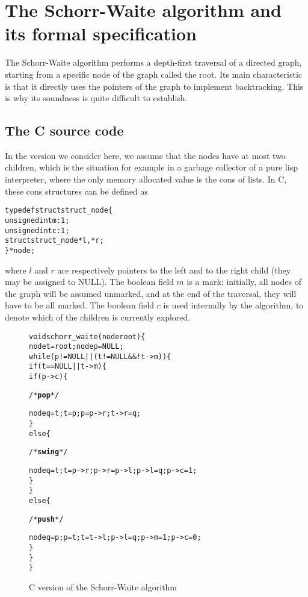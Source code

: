 
\section{The Schorr-Waite algorithm and its formal specification}
\label{sec:algo}

The Schorr-Waite algorithm performs a depth-first traversal of a
directed graph, starting from a specific node of the graph called the
root. Its main characteristic is that it directly uses the pointers of
the graph to implement backtracking. This is why its soundness is
quite difficult to establish. 

\subsection{The C source code}

In the version we consider here, we assume that the nodes have
at most two children, which is the situation for example in a garbage
collector of a pure lisp interpreter, where the only memory allocated
value is the \textsf{cons} of lists. In C, these \textsf{cons}
structures can be defined as
\begin{alltt}
typedef struct struct_node \{
  unsigned int m :1;
  unsigned int c :1;
  struct struct_node *l, *r;
\} * node;
\end{alltt}
where $l$ and $r$ are respectively pointers to the left and to the
right child (they may be assigned to NULL). The boolean field $m$ is a
mark: initially, all nodes of the graph will be assumed unmarked, and
at the end of the traversal, they will have to be all marked. The
boolean field $c$ is used internally by the algorithm, to denote which
of the children is currently explored.
 
\begin{figure}[b]
\vspace*{-5mm}
\hrulefill
\vspace*{-2mm}
\begin{alltt}
void schorr_waite(node root) \{
  node t = root; node p = NULL;
  while (p != NULL || (t != NULL && ! t->m)) \{
    if (t == NULL || t->m) \{
      if (p->c) \{ \begin{slshape}/* \textbf{pop} */\end{slshape}
        node q = t; t = p; p = p->r; t->r = q;
      \} 
      else \{ \begin{slshape}/* \textbf{swing} */\end{slshape}
        node q = t; t = p->r; p->r = p->l; p->l = q; p->c = 1;
      \}
    \} 
    else \{ \begin{slshape}/* \textbf{push} */ \end{slshape}
      node q = p; p = t; t = t->l; p->l = q; p->m = 1; p->c = 0;
    \}
  \}
\}
\end{alltt}
\vspace*{-5mm}
\caption{C version of the Schorr-Waite algorithm}
\label{fig:code}
\end{figure}

